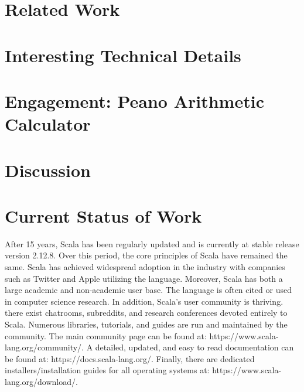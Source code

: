 \documentclass[jou,apacite]{IEEEtran}
\begin{document}
\section{Related Work}
\label{sec:related-work}


\section{Interesting Technical Details}
\label{sec:interesting-tech}









\section{Engagement: Peano Arithmetic Calculator}
\label{sec:engag-peano-arithm}

\section{Discussion}
\label{sec:discussion}

\section{Current Status of Work}
After 15 years, Scala has been regularly updated and is currently at stable
release version 2.12.8. Over this period, the core principles of Scala have
remained the same. Scala has achieved widespread adoption in the industry with
companies such as Twitter and Apple utilizing the language. Moreover, Scala has
both a large academic and non-academic user base. The language is often cited or
used in computer science research. In addition, Scala's user community is
thriving. there exist chatrooms, subreddits, and research conferences devoted
entirely to Scala. Numerous libraries, tutorials, and guides are run and
maintained by the community. The main community page can be found at:
https://www.scala-lang.org/community/. A detailed, updated, and easy to read
documentation can be found at: https://docs.scala-lang.org/. Finally, there are
dedicated installers/installation guides for all operating systems at:
https://www.scala-lang.org/download/.




\end{document}
